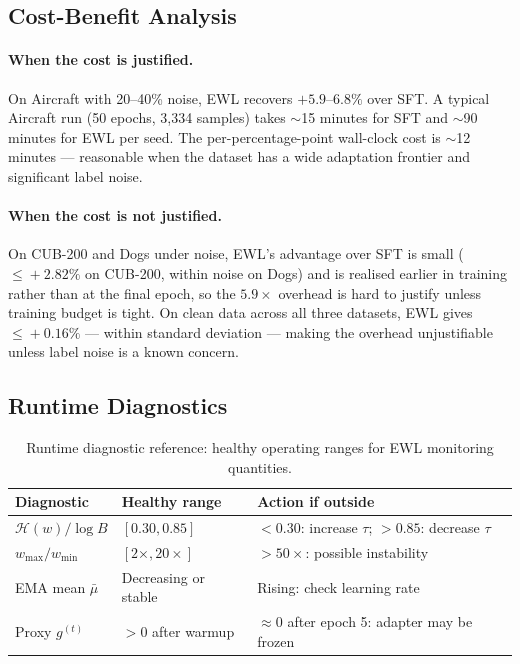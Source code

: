 \subsection{Cost-Benefit Analysis}

\paragraph{When the cost is justified.}
On Aircraft with 20--40\% noise, EWL recovers $+5.9$--$6.8\%$ over SFT.
A typical Aircraft run (50 epochs, 3,334 samples) takes $\sim$15 minutes for
SFT and $\sim$90 minutes for EWL per seed.
The per-percentage-point wall-clock cost is $\sim$12 minutes --- reasonable
when the dataset has a wide adaptation frontier and significant label noise.

\paragraph{When the cost is not justified.}
On CUB-200 and Dogs under noise, EWL's advantage over SFT is small
($\leq\!+2.82\%$ on CUB-200, within noise on Dogs) and is realised earlier
in training rather than at the final epoch, so the $5.9\times$ overhead is
hard to justify unless training budget is tight.
On clean data across all three datasets, EWL gives $\leq\!+0.16\%$ --- within
standard deviation --- making the overhead unjustifiable unless label noise
is a known concern.

\subsection{Runtime Diagnostics}

\begin{table}[h]
  \centering
  \caption{
    Runtime diagnostic reference: healthy operating ranges for EWL monitoring
    quantities.
  }
  \label{tab:diagnostics}
  \begin{tabular}{lll}
    \toprule
    \textbf{Diagnostic} & \textbf{Healthy range} & \textbf{Action if outside} \\
    \midrule
    $\mathcal{H}(w)/\log B$ & $[0.30, 0.85]$ & $<0.30$: increase $\tau$; $>0.85$: decrease $\tau$ \\
    $w_{\max}/w_{\min}$      & $[2\times, 20\times]$ & $>50\times$: possible instability \\
    EMA mean $\bar\mu$       & Decreasing or stable & Rising: check learning rate \\
    Proxy $g^{(t)}$          & $>0$ after warmup     & $\approx 0$ after epoch 5: adapter may be frozen \\
    \bottomrule
  \end{tabular}
\end{table}

